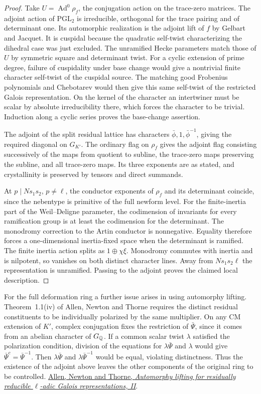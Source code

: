 \documentclass[a4paper,11pt]{article}
\theoremstyle{definition}
\theoremstyle{remark}
\numberwithin{equation}{section}
\begin{document}
\begin{proof}
Take \(U=\operatorname{Ad}^0\rho_f\), the conjugation action on
the trace-zero matrices. The adjoint action of \(\mathrm{PGL}_2\)
is irreducible, orthogonal for the trace pairing and of
determinant one. Its automorphic realization is the adjoint lift
of \(f\) by Gelbart and Jacquet. It is cuspidal because the
quadratic self-twist characterizing the dihedral case was just
excluded. The unramified Hecke parameters match those of \(U\)
by symmetric square and determinant twist. For a cyclic
extension of prime degree, failure of cuspidality under base
change would give a nontrivial finite character self-twist of
the cuspidal source. The matching good Frobenius polynomials
and Chebotarev would then give this same self-twist of the
restricted Galois representation. On the kernel of the character
an intertwiner must be scalar by absolute irreducibility there,
which forces the character to be trivial. Induction along a
cyclic series proves the base-change assertion.
\cite{VI-IV-I-gj123,VI-IV-I-ac123}

The adjoint of the split residual lattice has characters
\(\bar\phi,1,\bar\phi^{-1}\), giving the required diagonal on
\(G_{K'}\). The ordinary flag on \(\rho_f\) gives the adjoint
flag consisting successively of the maps from quotient to subline,
the trace-zero maps preserving the subline, and all trace-zero
maps. Its three exponents are as stated, and crystallinity
is preserved by tensors and direct summands.

At \(p\mid Ns_1s_2\), \(p\ne\ell\), the conductor exponents
of \(\rho_f\) and its determinant coincide, since the
nebentype is primitive of the full newform level. For the
finite-inertia part of the Weil--Deligne parameter, the
codimension of invariants for every ramification group is at
least the codimension for the determinant. The monodromy
correction to the Artin conductor is nonnegative. Equality
therefore forces a one-dimensional inertia-fixed space when
the determinant is ramified. The finite inertia action splits
as \(1\oplus\chi\xi\). Monodromy commutes with inertia and
is nilpotent, so vanishes on both distinct character lines.
Away from \(Ns_1s_2\ell\) the representation is unramified.
Passing to the adjoint proves the claimed local description.
\end{proof}

For the full deformation ring a further issue arises in using
automorphy lifting. Theorem~1.1(iv) of Allen, Newton and Thorne
requires the distinct residual constituents to be individually
polarized by the same multiplier. On any CM extension of \(K'\),
complex conjugation fixes the restriction of \(\bar\Psi\), since
it comes from an abelian character of \(G_\mathbb Q\). If a common
scalar twist \(\lambda\) satisfied the polarization condition,
division of the equations for \(\lambda\bar\Psi\) and
\(\lambda\) would give \(\bar\Psi^c=\bar\Psi^{-1}\).
Then \(\lambda\bar\Psi\) and \(\lambda\bar\Psi^{-1}\)
would be equal, violating distinctness. Thus the existence of
the adjoint above leaves the other components of the original
ring to be controlled.
\href{https://doi.org/10.1112/S0010437X20007484}{Allen,
Newton and Thorne, \emph{Automorphy lifting for residually
reducible \(\ell\)-adic Galois representations, II}}.
\end{document}
